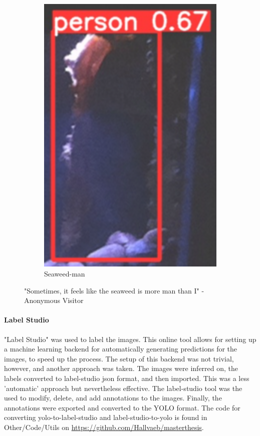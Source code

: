 \begin{figure}[H]
\begin{subfigure}{0.30\textwidth}
        \includegraphics[width=\textwidth]{Images/Fun/seaweed-man-closeup.png}
        \caption{Seaweed-man}
    \end{subfigure}
    \caption{"Sometimes, it feels like the seaweed is more man than I" -Anonymous Visitor}
    \label{fig:seaweed_man}
\end{figure}

\paragraph{Label Studio}
"Label Studio" was used to label the images. This online tool allows for setting up a machine learning backend for automatically generating predictions for the images, to speed up the process. The setup of this backend was not trivial, however, and another approach was taken. The images were inferred on, the labels converted to label-studio json format, and then imported. This was a less 'automatic' approach but nevertheless effective. The label-studio tool was the used to modify, delete, and add annotations to the images. Finally, the annotations were exported and converted to the YOLO format. The code for converting yolo-to-label-studio and label-studio-to-yolo is found in Other/Code/Utils on \href{https://github.com/Hallvaeb/masterthesis}{https://github.com/Hallvaeb/masterthesis}.

